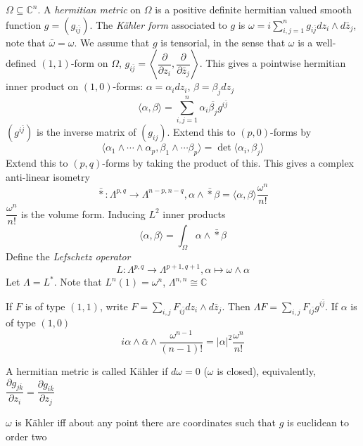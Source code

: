 \documentclass[../main.tex]{subfiles}
\begin{document}
\begin{definition}
$\Omega\subseteq\mathbb C^n$. A \textit{hermitian metric} on $\Omega$ is a positive definite hermitian valued smooth function $g=(g_{i\bar j})$. The \textit{K\"ahler form} associated to $g$ is $\omega=i\sum_{i,j=1}^ng_{i\bar j}dz_i\wedge d\bar z_j$, note that $\bar\omega=\omega$. We assume that $g$ is tensorial, in the sense that $\omega$ is a well-defined $(1,1)$-form on $\Omega$, $g_{i\bar j}=\left\langle\dfrac{\partial}{\partial z_i},\dfrac{\partial}{\partial\bar z_j}\right\rangle$. This gives a pointwise hermitian inner product on $(1,0)$-forms: $\alpha=\alpha_idz_i$, $\beta=\beta_jdz_j$
\[\langle\alpha,\beta\rangle=\sum_{i,j=1}^n\alpha_i\overline{\beta_j}g^{i\bar j}\]
$(g^{i\bar j})$ is the inverse matrix of  $(g_{ij})$. Extend this to $(p,0)$-forms by
\[\langle\alpha_1\wedge\cdots\wedge\alpha_p,\beta_1\wedge\cdots\beta_p\rangle=\det\langle\alpha_i,\beta_j\rangle\]
Extend this to $(p,q)$-forms by taking the product of this. This gives a complex anti-linear isometry
\[\bar*:\Lambda^{p,q}\to\Lambda^{n-p,n-q},\alpha\wedge\bar*\beta=\langle\alpha,\beta\rangle\frac{\omega^n}{n!}\]
$\dfrac{\omega^n}{n!}$ is the volume form. Inducing $L^2$ inner products
\[\langle\alpha,\beta\rangle=\int_\Omega\alpha\wedge\bar*\beta\]
Define the \textit{Lefschetz operator}
\[L:\Lambda^{p,q}\to\Lambda^{p+1,q+1},\alpha\mapsto\omega\wedge\alpha\]
Let $\Lambda=L^*$. Note that $L^n(1)=\omega^n$, $\Lambda^{n,n}\cong\mathbb C$
\end{definition}

\begin{example}
If $F$ is of type $(1,1)$, write $F=\sum_{i,j}F_{i\bar j}dz_i\wedge d\bar z_j$. Then $\Lambda F=\sum_{i,j}F_{i\bar j}g^{i\bar j}$. If $\alpha$ is of type $(1,0)$
\[i\alpha\wedge\bar\alpha\wedge\frac{\omega^{n-1}}{(n-1)!}=|\alpha|^2\frac{\omega^n}{n!}\]
\end{example}

\begin{definition}
A hermitian metric  is called K\"ahler if $d\omega=0$ ($\omega$ is closed), equivalently, $\dfrac{\partial g_{j\bar k}}{\partial z_i}=\dfrac{\partial g_{i\bar k}}{\partial z_j}$
\end{definition}

\begin{proposition}
$\omega$ is K\"ahler iff about any point there are coordinates such that $g$ is euclidean to order two
\end{proposition}
\end{document}
